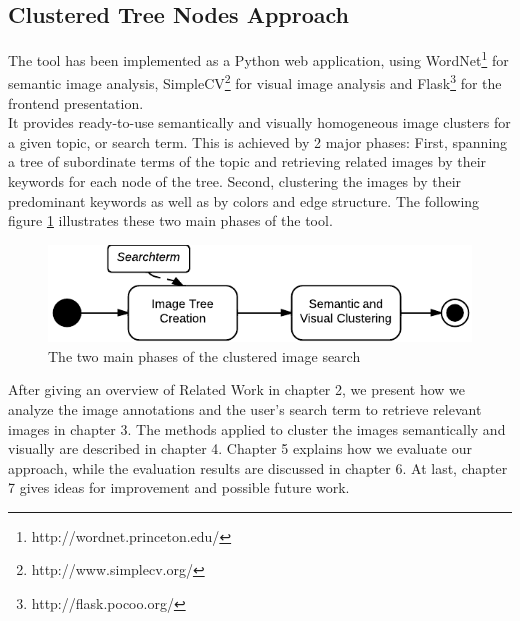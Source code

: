 \subsection{Clustered Tree Nodes Approach}
The tool has been implemented as a Python web application, using WordNet\footnote{http://wordnet.princeton.edu/} for semantic image analysis, SimpleCV\footnote{http://www.simplecv.org/} for visual image analysis and Flask\footnote{http://flask.pocoo.org/} for the frontend presentation.\\
It provides ready-to-use semantically and visually homogeneous image clusters for a given topic, or search term. This is achieved by 2 major phases: First, spanning a tree of subordinate terms of the topic and retrieving related images by their keywords for each node of the tree. Second, clustering the images by their predominant keywords as well as by colors and edge structure. The following figure \ref{fig_overallprocess} illustrates these two main phases of the tool.

\begin{figure}[h]
\centering
\includegraphics[]{images/search_process_highlevel.pdf}
\caption{The two main phases of the clustered image search}
\label{fig_overallprocess}
\end{figure}


\bigskip


After giving an overview of Related Work in chapter 2, we present how we analyze the image annotations and the user's search term to retrieve relevant images in chapter 3. The methods applied to cluster the images semantically and visually are described in chapter 4. Chapter 5 explains how we evaluate our approach, while the evaluation results are discussed in chapter 6. At last, chapter 7 gives ideas for improvement and possible future work.
